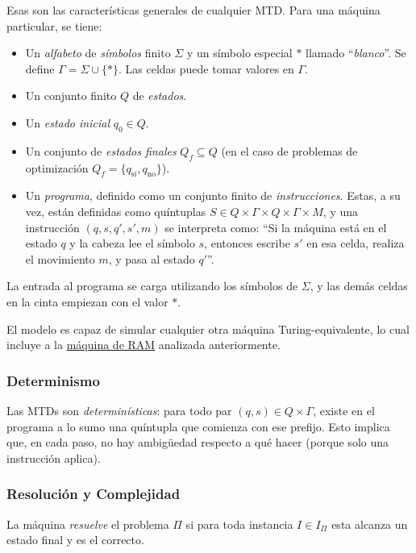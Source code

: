 Esas son las características generales de cualquier MTD. Para una máquina particular, se tiene:
\begin{itemize}
    \item Un \textit{alfabeto} de \textit{símbolos} finito $\Sigma$ y un símbolo especial $\ast$ llamado ``\textit{blanco}''. Se define $\Gamma = \Sigma \cup \{\ast\}$. Las celdas puede tomar valores en $\Gamma$.
    \item Un conjunto finito $Q$ de \textit{estados}.
    \item Un \textit{estado inicial} $q_0 \in Q$.
    \item Un conjunto de \textit{estados finales} $Q_f \subseteq Q$ (en el caso de problemas de optimización $Q_f = \{q_{\text{sí}}, q_{\text{no}}\}$).
    \item Un \textit{programa}, definido como un conjunto finito de \textit{instrucciones}. Estas, a su vez, están definidas como quíntuplas $S \in Q \times \Gamma \times Q \times \Gamma \times M$, y una instrucción $(q, s, q', s', m)$ se interpreta como: ``Si la máquina está en el estado $q$ y la cabeza lee el símbolo $s$, entonces escribe $s'$ en esa celda, realiza el movimiento $m$, y pasa al estado $q'$''.
\end{itemize}

La entrada al programa se carga utilizando los símbolos de $\Sigma$, y las demás celdas en la cinta empiezan con el valor $\ast$.

El modelo es capaz de simular cualquier otra máquina Turing-equivalente, lo cual incluye a la \hyperref[maquina-ram]{máquina de RAM} analizada anteriormente.

\subsubsection{Determinismo}

Las MTDs son \textit{determinísticas}: para todo par $(q, s) \in Q \times \Gamma$, existe en el programa a lo sumo una quíntupla que comienza con ese prefijo. Esto implica que, en cada paso, no hay ambigüedad respecto a qué hacer (porque solo una instrucción aplica).

\subsubsection{Resolución y Complejidad}

La máquina \textit{resuelve} el problema $\Pi$ si para toda instancia $I \in I_{\Pi}$ esta alcanza un estado final y es el correcto.

